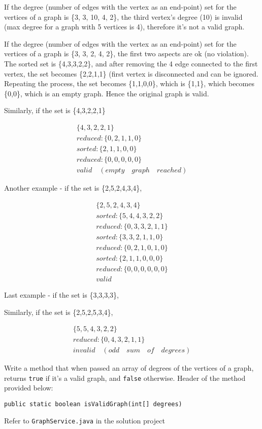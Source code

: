 \begin{questions}
If the degree (number of edges with the vertex as an end-point) set for the vertices of a graph is \{3, 3, 10, 4, 2\}, the third vertex's degree (10) is invalid (max degree for a graph with 5 vertices is 4), therefore it's not a valid graph.

If the degree (number of edges with the vertex as an end-point) set for the vertices of a graph is \{3, 3, 2, 4, 2\}, the first two aspects are ok (no violation). The sorted set is \{4,3,3,2,2\}, and after removing the 4 edge connected to the first vertex, the set becomes \{2,2,1,1\} (first vertex is disconnected and can be ignored. Repeating the process, the set becomes \{1,1,0,0\}, which is \{1,1\}, which becomes \{0,0\}, which is an empty graph. Hence the original graph is valid.

Similarly, if the set is \{4,3,2,2,1\}

\begin{align*}
\{4,3,2,2,1\}\\
reduced: \{0,2,1,1,0\}\\
sorted: \{2,1,1,0,0\}\\
reduced: \{0,0,0,0,0\}\\
valid \quad (empty \quad graph \quad reached)
\end{align*}

Another example - if the set is \{2,5,2,4,3,4\},

\begin{align*}
\{2,5,2,4,3,4\}\\
sorted: \{5,4,4,3,2,2\}\\
reduced: \{0,3,3,2,1,1\}\\
sorted: \{3,3,2,1,1,0\}\\
reduced: \{0,2,1,0,1,0\}\\
sorted: \{2,1,1,0,0,0\}\\
reduced: \{0,0,0,0,0,0\}\\
valid
\end{align*}

Last example - if the set is \{3,3,3,3\},

Similarly, if the set is \{2,5,2,5,3,4\},

\begin{align*}
\{5,5,4,3,2,2\}\\
reduced: \{0,4,3,2,1,1\}\\
invalid \quad (odd \quad sum \quad of \quad degrees)
\end{align*}

Write a method that when passed an array of degrees of the vertices of a graph, returns \texttt{true} if it's a valid graph, and \texttt{false} otherwise. Header of the method provided below:

\begin{lstlisting}
public static boolean isValidGraph(int[] degrees)
\end{lstlisting}

\begin{solution}
Refer to \texttt{GraphService.java} in the solution project	
\end{solution}
\end{questions}

